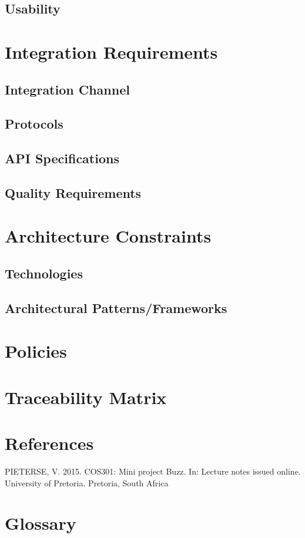 \documentclass[a4paper,12pt]{report}
\begin{document}
\subsection{Usability}

\section{Integration Requirements}
\subsection{Integration Channel}
\subsection{Protocols}
\subsection{API Specifications}
\subsection{Quality Requirements}

\section{Architecture Constraints}
\subsection{Technologies}
\subsection{Architectural Patterns/Frameworks}

\section{Policies}

\section{Traceability Matrix}

\section{References}
PIETERSE, V. 2015. COS301: Mini project Buzz. In: Lecture notes issued online. University of Pretoria. Pretoria, South Africa

\section{Glossary}
\end{document}
